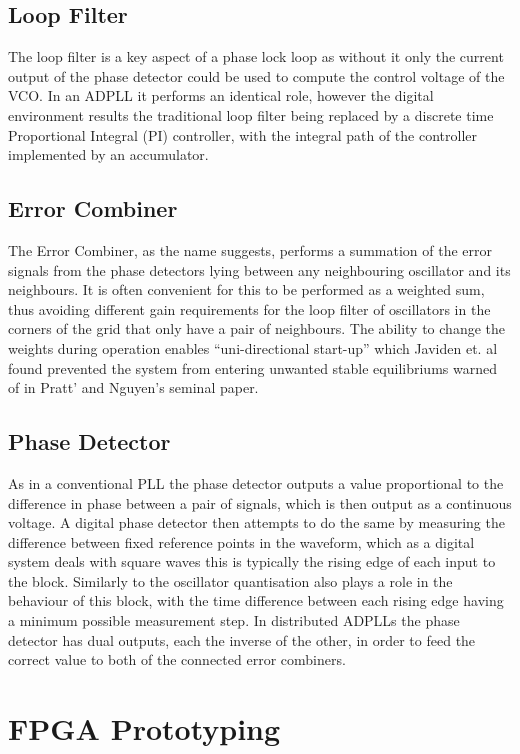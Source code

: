 \documentclass[conference]{IEEEtran}
\begin{document}
\subsection{Loop Filter}
The loop filter is a key aspect of a phase lock loop as without it only the current output of the phase detector could be used to compute the control voltage of the VCO.
In an ADPLL it performs an identical role, however the digital environment results the traditional loop filter being replaced by a discrete time Proportional Integral (PI) controller, with the integral path of the controller implemented by an accumulator.
\subsection{Error Combiner}
The Error Combiner, as the name suggests, performs a summation of the error signals from the phase detectors lying between any neighbouring oscillator and its neighbours. It is often convenient for this to be performed as a weighted sum, thus avoiding different gain requirements for the loop filter of oscillators in the corners of the grid that only have a pair of neighbours. The ability to change the weights during operation enables ``uni-directional start-up'' which Javiden et. al
\cite{javidan2011all} found prevented the system from entering unwanted stable equilibriums warned of in Pratt' and Nguyen's seminal paper.
\subsection{Phase Detector}
As in a conventional PLL the phase detector outputs a value proportional to the difference in phase between a pair of signals, which is then output as a continuous voltage.
A digital phase detector then attempts to do the same by measuring the difference between fixed reference points in the waveform, which as a digital system deals with square waves this is typically the rising edge of each input to the block.
Similarly to the oscillator quantisation also plays a role in the behaviour of this block, with the time difference between each rising edge having a minimum possible measurement step.
In distributed ADPLLs the phase detector has dual outputs, each the inverse of the other, in order to feed the correct value to both of the connected error combiners. 

\section{FPGA Prototyping}
\end{document}
